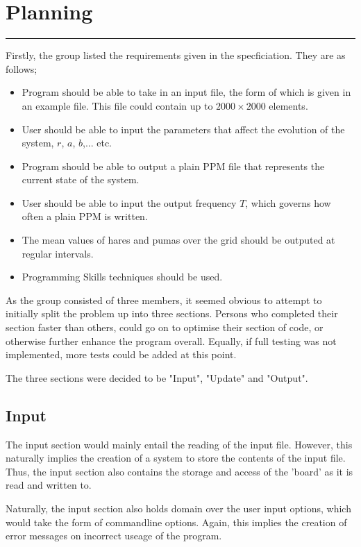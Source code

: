 \section{Planning}
\vspace{-2em}\rule{\textwidth}{1pt}\vspace{1em}

	Firstly, the group listed the requirements given in the specficiation.
	They are as follows;
	\begin{itemize}
		\item Program should be able to take in an input file, the form of which is given in an example file.
			This file could contain up to $2000\times2000$ elements.
		\item User should be able to input the parameters that affect the evolution of the system, $r$, $a$, $b$,... etc.
		\item Program should be able to output a plain PPM file that represents the current state of the system.
		\item User should be able to input the output frequency $T$, which governs how often a plain PPM is written.
		\item The mean values of hares and pumas over the grid should be outputed at regular intervals.
		\item Programming Skills techniques should be used.
	\end{itemize}
	As the group consisted of three members, it seemed obvious to attempt to initially split the problem up into three sections.
	Persons who completed their section faster than others, could go on to optimise their section of code, or otherwise further enhance the program overall.
	Equally, if full testing was not implemented, more tests could be added at this point.
	
	The three sections were decided to be "Input", "Update" and "Output".

	\subsection{Input}
		The input section would mainly entail the reading of the input file.
		However, this naturally implies the creation of a system to store the contents of the input file.
		Thus, the input section also contains the storage and access of the 'board' as it is read and written to.
		
		Naturally, the input section also holds domain over the user input options, which would take the form of commandline options.
		Again, this implies the creation of error messages on incorrect useage of the program.
		

